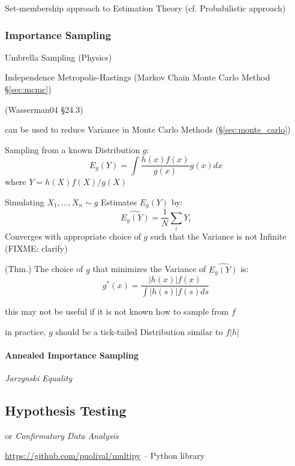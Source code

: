 Set-membership approach to Estimation Theory (cf. Probabilistic approach)



\subsubsection{Importance Sampling}\label{sec:importance_sampling}

Umbrella Sampling (Physics)

\fist Independence Metropolis-Hastings (Markov Chain Monte Carlo Method
\S\ref{sec:mcmc})

(Wasserman04 \S24.3)

can be used to reduce Variance in Monte Carlo Methods (\S\ref{sec:monte_carlo})

Sampling from a known Distribution $g$:
\[
  E_g(Y) = \int \frac{h(x)f(x)}{g(x)} g(x) dx
\]
where $Y = h(X)f(X)/g(X)$

Simulating $X_1, \ldots, X_n \sim g$ Estimates $E_g(Y)$ by:
\[
  \hat{E_g(Y)} = \frac{1}{N}\sum_i Y_i
\]
Converges with appropriate choice of $g$ such that the Variance is not Infinite
(FIXME: clarify)

(Thm.) The choice of $g$ that minimizes the Variance of $\hat{E_g(Y)}$ is:
\[
  g^*(x) = \frac{|h(x)| f(x)}{\int|h(s)| f(s) ds}
\]

this may not be useful if it is not known how to sample from $f$

in practice, $g$ should be a tick-tailed Distribution similar to $f|h|$



\paragraph{Annealed Importance Sampling}\label{sec:annealed_importance}\hfill

\emph{Jarzynski Equality}



\subsection{Hypothesis Testing}\label{sec:hypothesis_testing}

or \emph{Confirmatory Data Analysis}

\url{https://github.com/puolival/multipy} -- Python library

